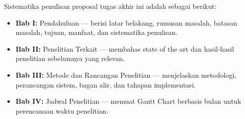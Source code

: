 
Sistematika penulisan proposal tugas akhir ini adalah sebagai berikut:

\begin{itemize}
  \item \textbf{Bab I:} Pendahuluan --- berisi latar belakang, rumusan masalah, batasan masalah, tujuan, manfaat, dan sistematika penulisan.
  \item \textbf{Bab II:} Penelitian Terkait --- membahas state of the art dan hasil-hasil penelitian sebelumnya yang relevan.
  \item \textbf{Bab III:} Metode dan Rancangan Penelitian --- menjelaskan metodologi, perancangan sistem, bagan alir, dan tahapan implementasi.
  \item \textbf{Bab IV:} Jadwal Penelitian --- memuat Gantt Chart berbasis bulan untuk perencanaan waktu penelitian.
\end{itemize}
